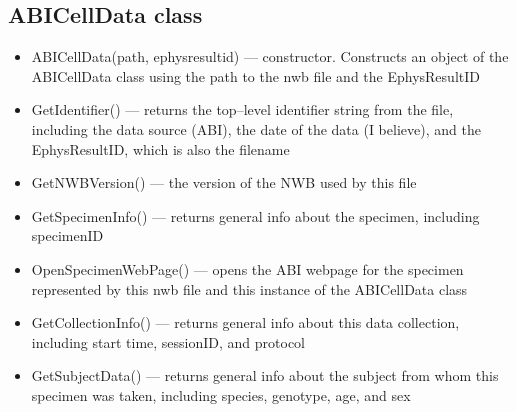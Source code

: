 \documentclass{article}
\begin{document}
\subsection{ABICellData class}
\begin{itemize}
	\item ABICellData(path, ephysresultid) --- constructor. Constructs an object of the ABICellData class using the path to the nwb file and the EphysResultID
	\item GetIdentifier() --- returns the top--level identifier string from the file, including the data source (ABI), the date of the data (I believe), and the EphysResultID, which is also the filename
	\item GetNWBVersion() --- the version of the NWB used by this file
	
	\item GetSpecimenInfo() --- returns general info about the specimen, including specimenID
	\item OpenSpecimenWebPage() --- opens the ABI webpage for the specimen represented by this nwb file and this instance of the ABICellData class
	\item GetCollectionInfo() --- returns general info about this data collection, including start time, sessionID, and protocol
	\item GetSubjectData() --- returns general info about the subject from whom this specimen was taken, including species, genotype, age, and sex
	

\end{itemize}
\end{document}

